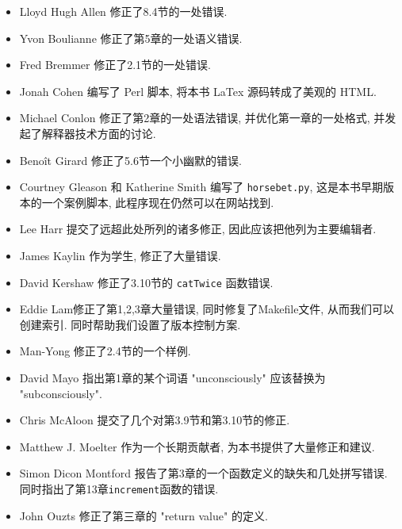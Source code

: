 \documentclass[10pt]{book}
\begin{document}
\begin{itemize}

\small
\item Lloyd Hugh Allen 修正了8.4节的一处错误. 

\item Yvon Boulianne 修正了第5章的一处语义错误. 

\item Fred Bremmer 修正了2.1节的一处错误. 

\item Jonah Cohen 编写了 Perl 脚本, 将本书 LaTex 源码转成了美观的 HTML. 

\item Michael Conlon 修正了第2章的一处语法错误, 并优化第一章的一处格式,  并发起了解释器技术方面的讨论. 

\item Beno\^{i}t Girard 修正了5.6节一个小幽默的错误. 

\item Courtney Gleason 和 Katherine Smith 编写了 {\tt horsebet.py}, 
这是本书早期版本的一个案例脚本, 此程序现在仍然可以在网站找到. 

\item Lee Harr 提交了远超此处所列的诸多修正, 因此应该把他列为主要编辑者. 

\item James Kaylin 作为学生, 修正了大量错误. 

\item David Kershaw 修正了3.10节的 {\tt catTwice} 函数错误. 

\item Eddie Lam修正了第1,2,3章大量错误, 同时修复了Makefile文件, 
从而我们可以创建索引. 同时帮助我们设置了版本控制方案. 

\item Man-Yong 修正了2.4节的一个样例. 

\item David Mayo 指出第1章的某个词语 "unconsciously"
应该替换为 "subconsciously".

\item Chris McAloon 提交了几个对第3.9节和第3.10节的修正. 

\item Matthew J. Moelter 作为一个长期贡献者, 为本书提供了大量修正和建议. 

\item Simon Dicon Montford 报告了第3章的一个函数定义的缺失和几处拼写错误.  同时指出了第13章{\tt increment}函数的错误. 

\item John Ouzts 修正了第三章的 "return value" 的定义. 


\end{itemize}
\end{document}
